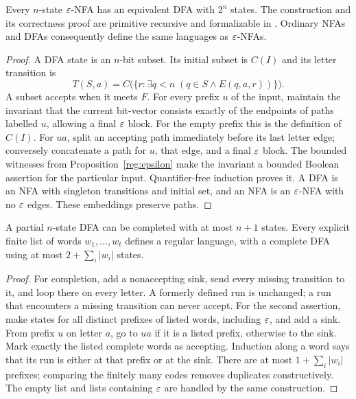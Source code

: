 \begin{theorem}\label{reg:subset}
Every $n$-state $\varepsilon$-NFA has an equivalent DFA with $2^n$ states.  The
construction and its correctness proof are primitive recursive and
formalizable in \ipra.  Ordinary NFAs and DFAs consequently define the same
languages as $\varepsilon$-NFAs.
\end{theorem}
\begin{proof}
A DFA state is an $n$-bit subset.  Its initial subset is $C(I)$ and its
letter transition is
\[
 T(S,a)=C\bigl(\{r:\exists q<n\;(q\in S\wedge E(q,a,r))\}\bigr).
\]
A subset accepts when it meets $F$.  For every prefix $u$ of the input,
maintain the invariant that the current bit-vector consists exactly of the
endpoints of paths labelled $u$, allowing a final $\varepsilon$ block.  For the
empty prefix this is the definition of $C(I)$.  For $ua$, split an accepting
path immediately before its last letter edge; conversely concatenate a path
for $u$, that edge, and a final $\varepsilon$ block.  The bounded witnesses from
Proposition~\ref{reg:epsilon} make the invariant a bounded Boolean
assertion for the particular input.  Quantifier-free induction proves it.
A DFA is an NFA with singleton transitions and initial set, and an NFA is
an $\varepsilon$-NFA with no $\varepsilon$ edges.  These embeddings preserve paths.
\end{proof}

\begin{proposition}\label{reg:finite}
A partial $n$-state DFA can be completed with at most $n+1$ states.  Every
explicit finite list of words $w_1,\ldots,w_t$ defines a regular language,
with a complete DFA using at most $2+\sum_i|w_i|$ states.
\end{proposition}
\begin{proof}
For completion, add a nonaccepting sink, send every missing transition to
it, and loop there on every letter.  A formerly defined run is unchanged;
a run that encounters a missing transition can never accept.
For the second assertion, make states for all distinct prefixes of listed
words, including $\varepsilon$, and add a sink.  From prefix $u$ on letter $a$, go
to $ua$ if it is a listed prefix, otherwise to the sink.  Mark exactly the
listed complete words as accepting.  Induction along a word says that its
run is either at that prefix or at the sink.  There are at most
$1+\sum_i|w_i|$ prefixes; comparing the finitely many codes removes
duplicates constructively.  The empty list and lists containing $\varepsilon$
are handled by the same construction.
\end{proof}

